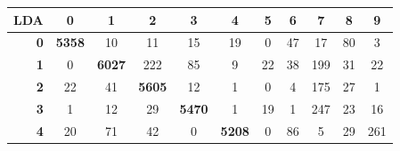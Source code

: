 \documentclass[
	12pt,				%
	openright,			%
	twoside,			%
	a4paper,			%
	english,			%
	brazil,				%
	svgnames
	]{abntex2}\usepackage[]{graphicx}\usepackage[]{color}
\begin{document}
\begin{table}[h]
\centering
\begin{tabular}{rcccccccccc}
\hline
\multicolumn{1}{r|}{\textbf{LDA}}        & \textbf{0}                         & \textbf{1}                         & \textbf{2}                         & \textbf{3}                         & \textbf{4}                         & \textbf{5}                         & \textbf{6}                         & \textbf{7}                         & \textbf{8}                         & \textbf{9}                         \\ \hline
\multicolumn{1}{r|}{\textbf{0}}          & \multicolumn{1}{c|}{\textbf{5358}} & 10                                 & 11                                 & 15                                 & 19                                 & 0                                  & 47                                 & 17                                 & 80                                 & 3                                  \\ \cline{2-3}
\multicolumn{1}{r|}{\textbf{1}}          & \multicolumn{1}{c|}{0}             & \multicolumn{1}{c|}{\textbf{6027}} & 222                                & 85                                 & 9                                  & 22                                 & 38                                 & 199                                & 31                                 & 22                                 \\ \cline{3-4}
\multicolumn{1}{r|}{\textbf{2}}          & 22                                 & \multicolumn{1}{c|}{41}            & \multicolumn{1}{c|}{\textbf{5605}} & 12                                 & 1                                  & 0                                  & 4                                  & 175                                & 27                                 & 1                                  \\ \cline{4-5}
\multicolumn{1}{r|}{\textbf{3}}          & 1                                  & 12                                 & \multicolumn{1}{c|}{29}            & \multicolumn{1}{c|}{\textbf{5470}} & 1                                  & 19                                 & 1                                  & 247                                & 23                                 & 16                                 \\ \cline{5-6}
\multicolumn{1}{r|}{\textbf{4}}          & 20                                 & 71                                 & 42                                 & \multicolumn{1}{c|}{0}             & \multicolumn{1}{c|}{\textbf{5208}} & 0                                  & 86                                 & 5                                  & 29                                 & 261                                \\ \cline{6-7}

\end{tabular}
\end{table}
\end{document}
